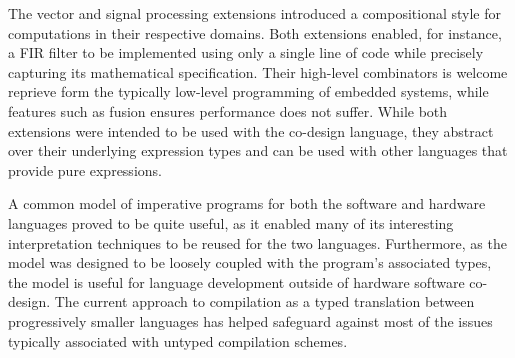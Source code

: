 \documentclass[../paper.tex]{subfiles}
\begin{document}
The vector and signal processing extensions introduced a compositional style for computations in their respective domains. Both extensions enabled, for instance, a FIR filter to be implemented using only a single line of code while precisely capturing its mathematical specification. Their high-level combinators is welcome reprieve form the typically low-level programming of embedded systems, while features such as fusion ensures performance does not suffer. While both extensions were intended to be used with the co-design language, they abstract over their underlying expression types and can be used with other languages that provide pure expressions.

A common model of imperative programs for both the software and hardware languages proved to be quite useful, as it enabled many of its interesting interpretation techniques to be reused for the two languages. Furthermore, as the model was designed to be loosely coupled with the program's associated types, the model is useful for language development outside of hardware software co-design. The current approach to compilation as a typed translation between progressively smaller languages has helped safeguard against most of the issues typically associated with untyped compilation schemes.




\end{document}
